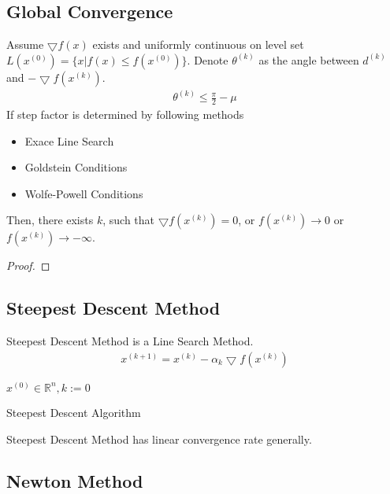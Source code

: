 \subsection{Global Convergence}
\begin{theorem}
    Assume $\bigtriangledown f(x)$ exists and uniformly continuous
    on level set $L(x^{(0)}) = \{ x | f(x) \leq f(x^{(0)})\}$.
    Denote $\theta^{(k)}$ as the angle between $d^{(k)}$
    and $-\bigtriangledown f(x^{(k)})$.
    \begin{align}
        \theta^{(k)} \leq \frac{\pi}{2} - \mu
    \end{align}
    If step factor is determined by following methods
    \begin{itemize}
        \item Exace Line Search
        \item Goldstein Conditions
        \item Wolfe-Powell Conditions
    \end{itemize}
    Then, there exists $k$, such that $\bigtriangledown f(x^{(k)}) = 0$,
    or $f(x^{(k)}) \rightarrow 0$ or $f(x^{(k)}) \rightarrow - \infty$.
\end{theorem}
\begin{proof}
    
\end{proof}

\subsection{Steepest Descent Method}
Steepest Descent Method is a Line Search Method.
\begin{align}
    x^{(k+1)} = x^{(k)} - \alpha_k \bigtriangledown f(x^{(k)})
\end{align}

\begin{algorithm}[H]
    \SetAlgoLined
     $x^{(0)} \in \mathbb{R}^n, k:= 0$\;
     \caption{Steepest Descent Algorithm}
\end{algorithm}
Steepest Descent Method has linear convergence rate generally.

\subsection{Newton Method}

